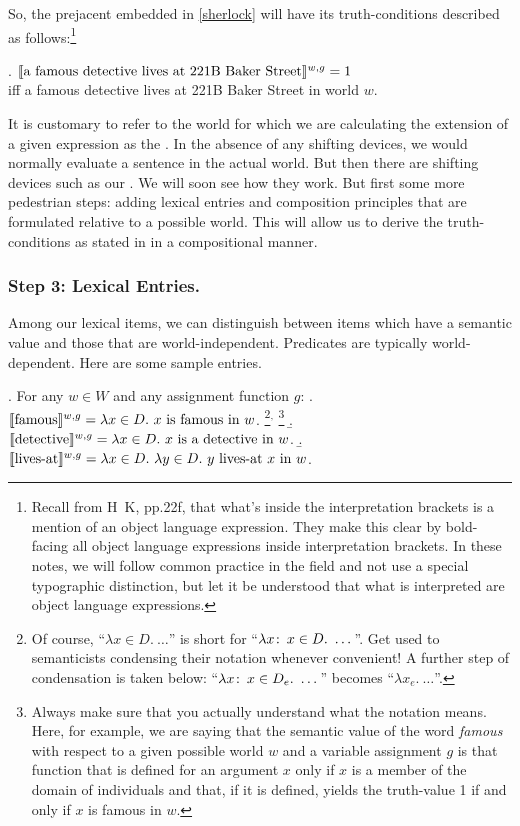 So, the prejacent embedded in \ref{sherlock} will have its
truth-conditions described as follows:\footnote{Recall from H\amp\ K,
  pp.22f, that what's inside the interpretation brackets is a mention
  of an object language expression. They make this clear by
  bold-facing all object language expressions inside interpretation
  brackets. In these notes, we will follow common practice in the
  field and not use a special typographic distinction, but let it be
  understood that what is interpreted are object language
  expressions.}

\ex. $\llbracket \mbox{a famous detective lives at 221B Baker Street} \rrbracket^{w,g} = 1$\\
iff a famous detective lives at 221B Baker Street in world $w$.

It is customary to refer to the world for which we are calculating the
extension of a given expression as the . In the
absence of any shifting devices, we would normally evaluate a sentence
in the actual world. But then there are shifting devices such as our
. We will soon see how
they work. But first some more pedestrian steps: adding lexical
entries and composition principles that are formulated relative to a
possible world. This will allow us to derive the truth-conditions as
stated in \Last in a compositional manner.

\subsubsection{Step 3: Lexical Entries.} \label{sec:lexical-entries}

Among our lexical items, we can distinguish between items which have a
 semantic value and those that are
world-independent. Predicates are typically world-dependent. Here are
some sample entries.

\ex. For any $w \in W$ and any assignment function $g$: \a.
$\llbracket \mbox{famous} \rrbracket^{w,g} = \lambda x \in D.\ x \mbox{ is famous in }
w$.%
\footnote{Of course, ``$\lambda x \in D.\ \dots$'' is short for
  ``$\lambda x\co x \in D.\ \dots$''. Get used to semanticists
  condensing their notation whenever convenient! A further step of
  condensation is taken below: ``$\lambda x\colon\thinspace x \in D_e.\ \dots$''
  becomes ``$\lambda x_e.\ \dots$''.}$^{,}$%
\footnote{Always make sure that you actually understand what the
  notation means. Here, for example, we are saying that the semantic
  value of the word \emph{famous} with respect to a given possible
  world $w$ and a variable assignment $g$ is that function that is
  defined for an argument $x$ only if $x$ is a member of the domain of
  individuals and that, if it is defined, yields the truth-value 1 if
  and only if $x$ is famous in $w$.} \b.
$\llbracket \mbox{detective} \rrbracket^{w,g} = \lambda x \in D.\ x \mbox{ is a
  detective in } w$.
\b.
$\sv{\mbox{lives-at}}^{w,g} = \lambda x \in D.\ \lambda y \in D.\ y
\mbox{ lives-at } x \mbox{ in } w $.

